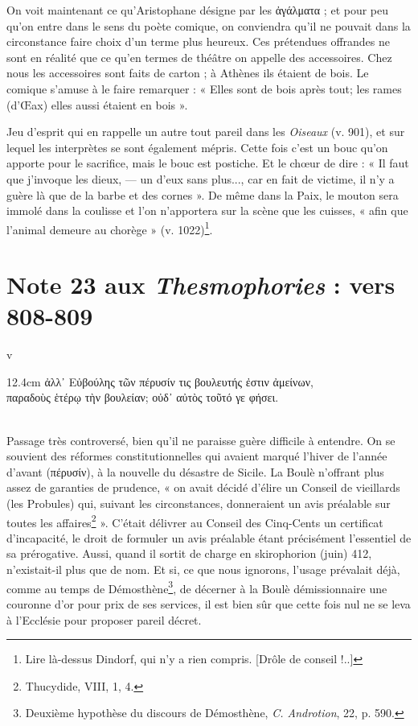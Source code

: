 \documentclass{book}%
\newcommand{\italique}[1]{\textit{#1}}%
\newcommand{\espace}[1]{\hspace{#1}}%
\newcommand{\fantome}{{\color{white}v}}
\newcommand{\Note}[1]{\section*{#1}%
\addcontentsline{toc}{section}{#1}}
\newcommand{\note}[1]{\footnote{#1}}
\newcommand{\citComm}[1]{\fantome\\
\espace{1cm}\begin{minipagewithmarginpars}{12.4cm}%
#1
\end{minipagewithmarginpars}%
}
\begin{document}
On voit maintenant ce qu'Aristophane désigne par les ἀγάλματα ; et pour peu qu'on entre dans le sens du poète comique, on conviendra qu'il ne pouvait dans la circonstance faire choix d'un terme plus heureux. Ces prétendues offrandes ne sont en réalité que ce qu'en termes de théâtre on appelle des accessoires. Chez nous les accessoires sont faits de carton ; à Athènes ils étaient de bois. Le comique s'amuse à le faire remarquer : « Elles sont de bois après tout; les rames (d'Œax) elles aussi étaient en bois ». 

Jeu d'esprit qui en rappelle un autre tout pareil dans les \italique{Oiseaux} (v. 901), et sur lequel les interprètes se sont également mépris. Cette fois c'est un bouc qu'on apporte pour le sacrifice, mais le bouc est postiche. Et le chœur de dire : « Il faut que j'invoque les dieux, — un d'eux sans plus..., car en fait de victime, il n'y a guère là que de la barbe et des cornes ». De même dans la Paix, le mouton sera immolé dans la coulisse et l'on n'apportera sur la scène que les cuisses, « afin que l'animal demeure au chorège » (v. 1022)\note{Lire là-dessus Dindorf, qui n'y a rien compris. [Drôle de conseil !..]}.


\Note{Note 23 aux \italique{Thesmophories} : vers 808-809}

\citComm{ἀλλ᾽ Εὐβούλης τῶν πέρυσίν τις βουλευτής ἐστιν ἀμείνων,\\
	παραδοὺς ἑτέρῳ τὴν βουλείαν; οὐδ᾽ αὐτὸς τοῦτό γε φήσει.}\\

Passage très controversé, bien qu'il ne paraisse guère difficile à entendre. On se souvient des réformes constitutionnelles qui avaient marqué l'hiver de l'année d'avant (πέρυσίν), à la nouvelle du désastre de Sicile. La Boulè n'offrant plus assez de garanties de prudence, « on avait décidé d'élire un Conseil de vieillards (les Probules) qui, suivant les circonstances, donneraient un avis préalable sur toutes les affaires\note{Thucydide, VIII, 1, 4.} ». 
C'était délivrer au Conseil des Cinq-Cents un certificat d'incapacité, le droit de formuler un avis préalable étant précisément l'essentiel de sa prérogative. 
Aussi, quand il sortit de charge en skirophorion (juin) 412, n'existait-il plus que de nom. 
Et si, ce que nous ignorons, l'usage prévalait déjà, comme au temps de Démosthène\note{Deuxième hypothèse du discours de Démosthène, \italique{C. Androtion}, 22, p. 590.}, de décerner à la Boulè démissionnaire une couronne d'or pour prix de ses services, il est bien sûr que cette fois nul ne se leva à l'Ecclésie pour proposer pareil décret. 
\end{document}
